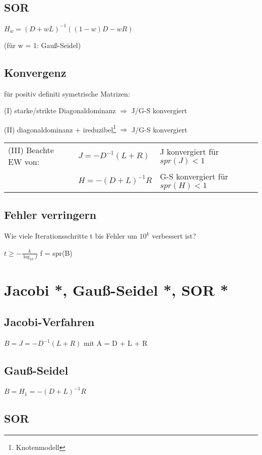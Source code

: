 \documentclass[12pt,a4paper]{article} %
\newcommand*\tab[1][1cm]{\hspace*{#1}}
\begin{document}
	\subsection{SOR}
	
	$H_w = (D + wL)^{-1}((1 - w)D - wR)$
	
	(für w = 1: Gauß-Seidel)
	
	\subsection{Konvergenz}
	
	für positiv definiti symetrische Matrizen:
	
	(I) starke/strikte Diagonaldominanz $\Rightarrow$ J/G-S konvergiert
	
	(II) diagonaldominanz + ireduzibel\footnote{Knotenmodell} $\Rightarrow$ J/G-S konvergiert
	
	\begin{tabular}{l l l}
		(III) Beachte EW von: & $J = -D^{-1}(L + R)$ & J konvergiert für $spr(J) < 1$ \\
		& $H = -(D + L)^{-1}R$ & G-S konvergiert für $spr(H) < 1$
	\end{tabular}
	
	\subsection{Fehler verringern}
	
	Wie viele Iterationsschritte t bis Fehler um $10^k$ verbessert ist?
	
	$t \ge -\frac{k}{\log_{10}f}$ \tab f = spr(B)\section{Jacobi *, Gauß-Seidel *, SOR *}
	
	\subsection{Jacobi-Verfahren}
	
	$B = J = -D^{-1}(L + R)$ mit A = D + L + R
	
	\subsection{Gauß-Seidel}
	
	$B = H_1 = -(D + L)^{-1}R$
	
	\subsection{SOR}
	
\end{document}
